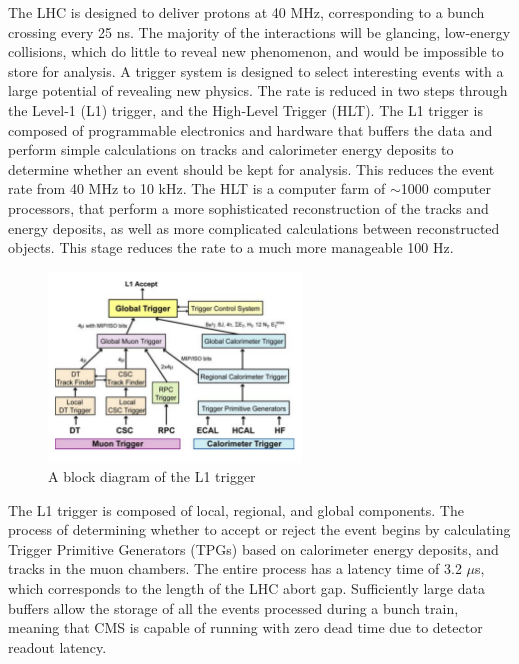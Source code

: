 \par The LHC is designed to deliver protons at 40 MHz, corresponding
to a bunch crossing every 25 ns.  The majority of the interactions will
be glancing, low-energy collisions, which do little to reveal new
phenomenon, and would be impossible to store for analysis.  A trigger
system is designed to select interesting events with a large potential
of revealing new physics.  The rate is reduced in two steps through
the Level-1 (L1) trigger, and the High-Level Trigger (HLT).  The L1
trigger is composed of programmable electronics and hardware that
buffers the data and perform simple calculations on tracks and
calorimeter energy deposits to determine whether an event should be
kept for analysis.  This reduces the event rate from 40 MHz to 10
kHz.  The HLT is a computer farm of $\sim$1000 computer processors,
that perform a more sophisticated reconstruction of the tracks and
energy deposits, as well as more complicated calculations between
reconstructed objects.  This stage reduces the rate to a much more
manageable 100 Hz.    

\begin{figure}[h]
   \centering
  \includegraphics[width=0.6\textwidth]{Figures/CMS_Diagrams/Trigger__L1_layout.pdf}
  \caption{A block diagram of the L1 trigger
    \cite{CMS:CMS_Machine_Chatrchyan:2008aa}}\label{fig:tigger_L1_layout} 
\end{figure}

\par The L1 trigger is composed of local, regional, and global
components.  The process of determining whether to accept or reject
the event begins by calculating Trigger Primitive Generators (TPGs)
based on calorimeter energy deposits, and tracks in the muon
chambers.  The entire process has a latency time of 3.2 $\mu$s, which
corresponds to the length of the LHC abort gap.  Sufficiently large
data buffers allow the storage of all the events processed during a
bunch train, meaning that CMS is capable of running with zero dead
time due to detector readout latency.  

